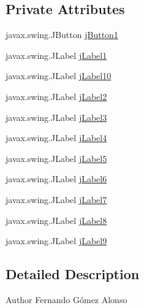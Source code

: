 \subsection*{Private Attributes}
\begin{DoxyCompactItemize}
\item 
javax.\+swing.\+J\+Button \mbox{\hyperlink{class_interfaz_package_1_1_consulta_lector_a89e1d76ca4c265da8a91df4b4a2a030d}{j\+Button1}}
\item 
javax.\+swing.\+J\+Label \mbox{\hyperlink{class_interfaz_package_1_1_consulta_lector_a902ef6727581a080bfe5c84883c7f39e}{j\+Label1}}
\item 
javax.\+swing.\+J\+Label \mbox{\hyperlink{class_interfaz_package_1_1_consulta_lector_a4325d1c8a4fb7c899a653eaf0380ccad}{j\+Label10}}
\item 
javax.\+swing.\+J\+Label \mbox{\hyperlink{class_interfaz_package_1_1_consulta_lector_abd8a9863dc8780ef20182d8e6de1f544}{j\+Label2}}
\item 
javax.\+swing.\+J\+Label \mbox{\hyperlink{class_interfaz_package_1_1_consulta_lector_a105b198c795b5ad60698132d959db7c1}{j\+Label3}}
\item 
javax.\+swing.\+J\+Label \mbox{\hyperlink{class_interfaz_package_1_1_consulta_lector_a17804aaae39ab2791472fa0422b576ff}{j\+Label4}}
\item 
javax.\+swing.\+J\+Label \mbox{\hyperlink{class_interfaz_package_1_1_consulta_lector_aae29076b214d7968c66c12c3cb9dcab2}{j\+Label5}}
\item 
javax.\+swing.\+J\+Label \mbox{\hyperlink{class_interfaz_package_1_1_consulta_lector_a1ae0bbc522d743dbe6a5df3d341f7b3b}{j\+Label6}}
\item 
javax.\+swing.\+J\+Label \mbox{\hyperlink{class_interfaz_package_1_1_consulta_lector_a0811e604bafe32c5d692a79c0f604233}{j\+Label7}}
\item 
javax.\+swing.\+J\+Label \mbox{\hyperlink{class_interfaz_package_1_1_consulta_lector_a588cac9adcc7b646bf632082a010dde4}{j\+Label8}}
\item 
javax.\+swing.\+J\+Label \mbox{\hyperlink{class_interfaz_package_1_1_consulta_lector_a96866944f1cce16d0348b78422bbb375}{j\+Label9}}
\end{DoxyCompactItemize}


\subsection{Detailed Description}
\begin{DoxyAuthor}{Author}
Fernando Gómez Alonso 
\end{DoxyAuthor}


